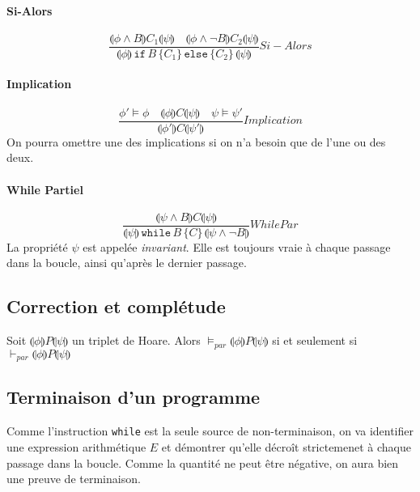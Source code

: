 \documentclass[a4paper]{article}
\begin{document}
  \paragraph{Si-Alors}
  $$  \frac{
        \llparenthesis \phi \land B \rrparenthesis C_1 \llparenthesis \psi \rrparenthesis \quad
        \llparenthesis \phi \land \lnot B \rrparenthesis C_2 \llparenthesis \psi \rrparenthesis
      }
      {
        \llparenthesis \phi \rrparenthesis\, \texttt{if}\, B\, \{ C_1 \}\, \texttt{else}\, \{ C_2\}\, \llparenthesis \psi \rrparenthesis
      } Si-Alors
  $$ 

  \paragraph{Implication}
  $$
    \frac{
      \phi' \vDash \phi \quad \llparenthesis\phi\rrparenthesis C \llparenthesis\psi\rrparenthesis \quad \psi \vDash \psi'
    }
    {
      \llparenthesis\phi'\rrparenthesis C \llparenthesis\psi'\rrparenthesis
    } Implication
  $$
  On pourra omettre une des implications si on n'a besoin que de l'une ou des deux.

  \paragraph{While Partiel}
  $$
    \frac{
      \llparenthesis\psi \land B \rrparenthesis C \llparenthesis\psi\rrparenthesis
    }
    {
      \llparenthesis\psi\rrparenthesis\, \texttt{while}\, B\, \{C\}\, \llparenthesis\psi \land \lnot B \rrparenthesis
    } WhilePar
  $$
  La propriété $\psi$ est appelée \textit{invariant}. Elle est toujours vraie à chaque
  passage dans la boucle, ainsi qu'après le dernier passage.

  \subsection{Correction et complétude}
  Soit $\llparenthesis\phi\rrparenthesis P \llparenthesis\psi\rrparenthesis$ un triplet
  de Hoare. Alors $\vDash_{par} \llparenthesis\phi\rrparenthesis P \llparenthesis\psi\rrparenthesis$
  si et seulement si $\vdash_{par} \llparenthesis\phi\rrparenthesis P \llparenthesis\psi\rrparenthesis$

  \subsection{Terminaison d'un programme}
  Comme l'instruction \texttt{while} est la seule source de non-terminaison,
  on va identifier une expression arithmétique $E$ et démontrer qu'elle
  décroît strictemenet à chaque passage dans la boucle. Comme la quantité ne peut
  être négative, on aura bien une preuve de terminaison. \\
\end{document}
